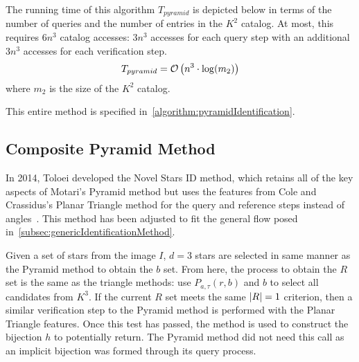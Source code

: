 \begin{algorithm}[ht]
\end{algorithm}

The running time of this algorithm $T_{pyramid}$ is depicted below in terms of the number of queries and the number
of entries in the $K^2$ catalog.
At most, this requires $6n^3$ catalog accesses: $3n^3$ accesses for each query step with an additional $3n^3$ accesses
for each verification step.
\begin{equation}
    T_{pyramid} = \mathcal{O} \left( n^3 \cdot \log( m_2 ) \right)
\end{equation}
where $m_2$ is the size of the $K^2$ catalog.

This entire method is specified in~\autoref{algorithm:pyramidIdentification}.

\subsection{Composite Pyramid Method}\label{subsec:compositePyramidMethod}
In 2014, Toloei developed the Novel Stars ID method, which retains all of the key aspects of Motari's
Pyramid method but uses the features from Cole and Crassidus's Planar Triangle method for the query and reference steps
instead of angles~\cite{Composite}.
This method has been adjusted to fit the general flow posed in~\autoref{subsec:genericIdentificationMethod}.

Given a set of stars from the image $I$, $d = 3$ stars are selected in same manner as the Pyramid method to obtain
the $b$ set.
From here, the process to obtain the $R$ set is the same as the triangle methods: use $P_{a, \tau}(r, b)$ and $b$ to
select all candidates from $K^3$.
If the current $R$ set meets the same $\left| R \right| = 1$ criterion, then a similar verification step to the Pyramid method
is performed with the Planar Triangle features.
Once this test has passed, the  method is used to construct the bijection $h$ to potentially return.
The Pyramid method did not need this call as an implicit bijection was formed through its query process.

